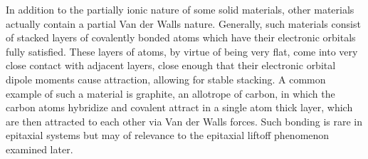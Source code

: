 In addition to the partially ionic nature of some solid materials, other materials actually contain a partial Van der Walls nature. Generally, such materials consist of stacked layers of covalently bonded atoms which have their electronic orbitals fully satisfied. These layers of atoms, by virtue of being very flat, come into very close contact with adjacent layers, close enough that their electronic orbital dipole moments cause attraction, allowing for stable stacking. A common example of such a material is graphite, an allotrope of carbon, in which the carbon atoms hybridize and covalent attract in a single atom thick layer, which are then attracted to each other via Van der Walls forces. Such bonding is rare in epitaxial systems but may of relevance to the epitaxial liftoff phenomenon examined later.


